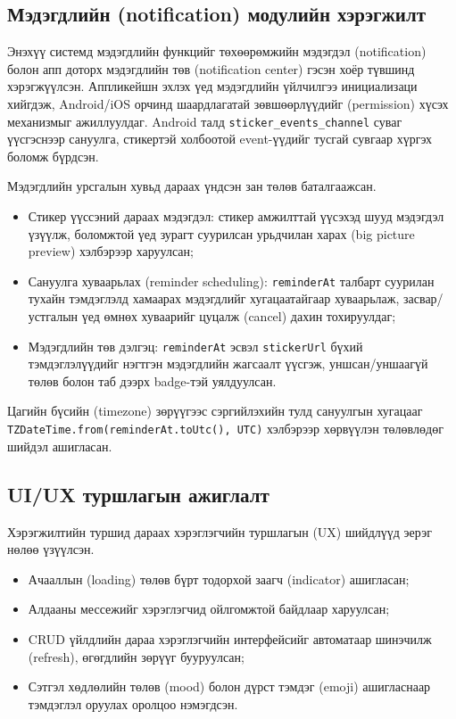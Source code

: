 \subsection{Мэдэгдлийн (notification) модулийн хэрэгжилт}
\label{subsec:notification_result}

Энэхүү системд мэдэгдлийн функцийг төхөөрөмжийн мэдэгдэл (notification) болон апп доторх мэдэгдлийн төв (notification center) гэсэн хоёр түвшинд хэрэгжүүлсэн. Аппликейшн эхлэх үед мэдэгдлийн үйлчилгээ инициализаци хийгдэж, Android/iOS орчинд шаардлагатай зөвшөөрлүүдийг (permission) хүсэх механизмыг ажиллуулдаг. Android талд \texttt{sticker\_events\_channel} суваг үүсгэснээр сануулга, стикертэй холбоотой event-үүдийг тусгай сувгаар хүргэх боломж бүрдсэн.

Мэдэгдлийн урсгалын хувьд дараах үндсэн зан төлөв баталгаажсан.

\begin{itemize}
    \item Стикер үүссэний дараах мэдэгдэл: стикер амжилттай үүсэхэд шууд мэдэгдэл үзүүлж, боломжтой үед зурагт суурилсан урьдчилан харах (big picture preview) хэлбэрээр харуулсан;
    \item Сануулга хуваарьлах (reminder scheduling): \texttt{reminderAt} талбарт суурилан тухайн тэмдэглэлд хамаарах мэдэгдлийг хугацаатайгаар хуваарьлаж, засвар/устгалын үед өмнөх хуваарийг цуцалж (cancel) дахин тохируулдаг;
    \item Мэдэгдлийн төв дэлгэц: \texttt{reminderAt} эсвэл \texttt{stickerUrl} бүхий тэмдэглэлүүдийг нэгтгэн мэдэгдлийн жагсаалт үүсгэж, уншсан/уншаагүй төлөв болон таб дээрх badge-тэй уялдуулсан.
\end{itemize}

Цагийн бүсийн (timezone) зөрүүгээс сэргийлэхийн тулд сануулгын хугацааг \texttt{TZDateTime.from(reminderAt.toUtc(), UTC)} хэлбэрээр хөрвүүлэн төлөвлөдөг шийдэл ашигласан.

\subsection{UI/UX туршлагын ажиглалт}
\label{subsec:uiux_observation}

Хэрэгжилтийн туршид дараах хэрэглэгчийн туршлагын (UX) шийдлүүд эерэг нөлөө үзүүлсэн.

\begin{itemize}
    \item Ачааллын (loading) төлөв бүрт тодорхой заагч (indicator) ашигласан;
    \item Алдааны мессежийг хэрэглэгчид ойлгомжтой байдлаар харуулсан;
    \item CRUD үйлдлийн дараа хэрэглэгчийн интерфейсийг автоматаар шинэчилж (refresh), өгөгдлийн зөрүүг бууруулсан;
    \item Сэтгэл хөдлөлийн төлөв (mood) болон дүрст тэмдэг (emoji) ашигласнаар тэмдэглэл оруулах оролцоо нэмэгдсэн.
\end{itemize}

